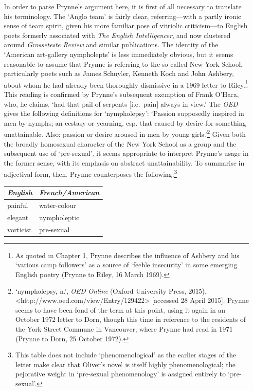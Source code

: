 \documentclass[]{article}
\begin{document}
In order to parse Prynne’s argument here, it is first of all necessary
to translate his terminology. The ‘Anglo team’ is fairly clear,
referring—with a partly ironic sense of team spirit, given his more
familiar pose of vitriolic criticism—to English poets formerly
associated with \emph{The English Intelligencer}, and now clustered
around \emph{Grosseteste Review} and similar publications. The identity
of the ‘American art-gallery nympholepts’ is less immediately obvious,
but it seems reasonable to assume that Prynne is referring to the
so-called New York School, particularly poets such as James Schuyler,
Kenneth Koch and John Ashbery, about whom he had already been thoroughly
dismissive in a 1969 letter to Riley.\footnote{As quoted in Chapter 1,
  Prynne describes the influence of Ashbery and his ‘various camp
  followers’ as a source of ‘feeble insecurity’ in some emerging English
  poetry (Prynne to Riley, 16 March 1969).} This reading is confirmed by
Prynne’s subsequent exemption of Frank O’Hara, who, he claims, ‘had that
pail of serpents {[}i.e.~pain{]} always in view.’ The \emph{OED} gives
the following definitions for ‘nympholepsy’: ‘Passion supposedly
inspired in men by nymphs; an ecstasy or yearning, esp. that caused by
desire for something unattainable. Also: passion or desire aroused in
men by young girls.’\footnote{‘nympholepsy, n.’, \emph{OED Online}
  (Oxford University Press, 2015),
  \textless{}http://www.oed.com/view/Entry/129422\textgreater{}
  {[}accessed 28 April 2015{]}. Prynne seems to have been fond of the
  term at this point, using it again in an October 1972 letter to Dorn,
  though this time in reference to the residents of the York Street
  Commune in Vancouver, where Prynne had read in 1971 (Prynne to Dorn,
  25 October 1972).} Given both the broadly homosexual character of the
New York School as a group and the subsequent use of ‘pre-sexual’, it
seems appropriate to interpret Prynne’s usage in the former sense, with
its emphasis on abstract unattainability. To summarise in adjectival
form, then, Prynne counterposes the following:\footnote{This table does
  not include ‘phenomenological’ as the earlier stages of the letter
  make clear that Oliver’s novel is itself highly phenomenological; the
  pejorative weight in ‘pre-sexual phenomenology’ is assigned entirely
  to ‘pre-sexual’.}

\begin{longtable}[c]{@{}ll@{}}
\toprule
\emph{English} & \emph{French/American}\tabularnewline
\midrule
\endhead
painful & water-colour\tabularnewline
elegant & nympholeptic\tabularnewline
vorticist & pre-sexual\tabularnewline
\bottomrule
\end{longtable}
\end{document}
